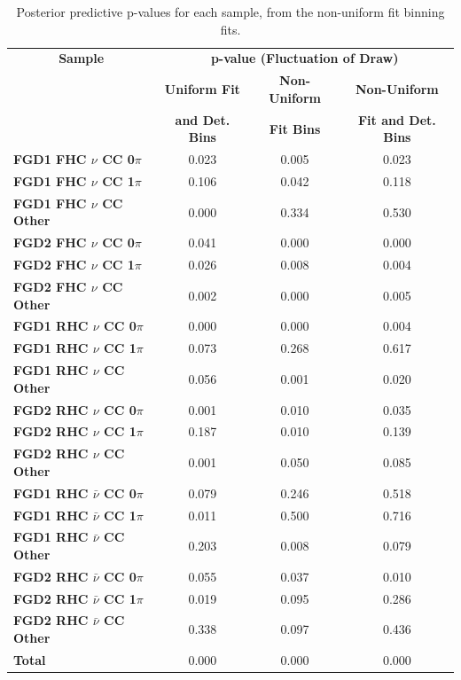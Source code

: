 \begin{center}
\begin{table}
\center
\begin{tabular}{l||c c c}
\hline \hline
\multicolumn{1}{c||}{\textbf{Sample}} & \multicolumn{3}{c}{\textbf{p-value (Fluctuation of Draw)}} \\
& \multicolumn{1}{c}{\textbf{Uniform Fit}} & \multicolumn{1}{c}{\textbf{Non-Uniform}} & \multicolumn{1}{c}{\textbf{Non-Uniform}}\\
& \multicolumn{1}{c}{\textbf{and Det. Bins}} & \multicolumn{1}{c}{\textbf{Fit Bins}} & \multicolumn{1}{c}{\textbf{Fit and Det. Bins}}\\
\hline\hline
\textbf{FGD1 FHC $\nu$ CC 0$\pi$} & 0.023 & 0.005 & 0.023 \\ 
\textbf{FGD1 FHC $\nu$ CC 1$\pi$} & 0.106 & 0.042 & 0.118 \\
\textbf{FGD1 FHC $\nu$ CC Other} & 0.000 & 0.334 & 0.530 \\ \hline
\textbf{FGD2 FHC $\nu$ CC 0$\pi$} & 0.041 & 0.000 & 0.000 \\
\textbf{FGD2 FHC $\nu$ CC 1$\pi$} & 0.026 & 0.008 & 0.004\\ 
\textbf{FGD2 FHC $\nu$ CC Other} & 0.002 & 0.000 & 0.005\\ \hline
\textbf{FGD1 RHC $\nu$ CC 0$\pi$} & 0.000 & 0.000 & 0.004\\
\textbf{FGD1 RHC $\nu$ CC 1$\pi$} & 0.073 & 0.268 & 0.617 \\
\textbf{FGD1 RHC $\nu$ CC Other} & 0.056 & 0.001 & 0.020 \\ \hline
\textbf{FGD2 RHC $\nu$ CC 0$\pi$} & 0.001 & 0.010 & 0.035 \\
\textbf{FGD2 RHC $\nu$ CC 1$\pi$} & 0.187 & 0.010 & 0.139\\
\textbf{FGD2 RHC $\nu$ CC Other} & 0.001 & 0.050 & 0.085 \\ \hline
\textbf{FGD1 RHC $\bar{\nu}$ CC 0$\pi$} & 0.079 & 0.246 & 0.518 \\
\textbf{FGD1 RHC $\bar{\nu}$ CC 1$\pi$} & 0.011 & 0.500 & 0.716\\
\textbf{FGD1 RHC $\bar{\nu}$ CC Other} & 0.203 & 0.008 & 0.079\\ \hline
\textbf{FGD2 RHC $\bar{\nu}$ CC 0$\pi$} & 0.055 & 0.037 & 0.010\\
\textbf{FGD2 RHC $\bar{\nu}$ CC 1$\pi$} & 0.019 & 0.095 & 0.286\\
\textbf{FGD2 RHC $\bar{\nu}$ CC Other} & 0.338 & 0.097 & 0.436\\ \hline
\textbf{Total} & 0.000 & 0.000 & 0.000 \\ \hline\hline
\end{tabular}
\caption{Posterior predictive p-values for each sample, from the non-uniform fit binning fits.}
\label{tab:polypval}
\end{table}
\end{center}


